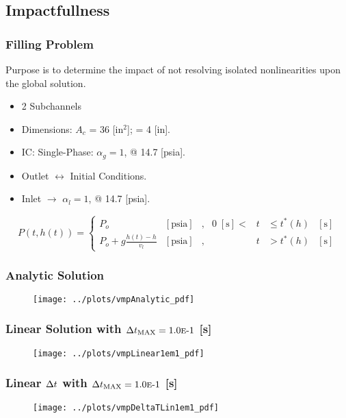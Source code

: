 \documentclass[compress,xcolor=table]{beamer}
\begin{document}
\subsection[Impactfullness]{Impactfullness}
\begin{frame}
\frametitle{Filling Problem}

Purpose is to determine the impact of not resolving isolated nonlinearities upon the global solution.

\begin{itemize}
\item{2 Subchannels}
\item{Dimensions: $A_{c}$ = 36 [in$^2$]; \dx{} = 4 [in].}
\item{IC: Single-Phase: $\alpha_{g} = 1$, @ 14.7 [psia].}
\item{Outlet $\longleftrightarrow$ Initial Conditions.}
\item{Inlet $\rightarrow$ $\alpha_{l}=1$, @ 14.7 [psia].}
\end{itemize}
\begin{equation*}
P(t, h(t))= 
 \left\{
\begin{array}{cclrcll}
P_o & [ \text{psia} ] & , & 0\; [\text{s}] < & t & \leq t^{*}(h) & [\text{s}] \\
P_o + g \frac{ h(t) - h }{ v_{l} } & [ \text{psia} ] & , &  & t & > t^{*}(h) & [\text{s}]
\end{array}\right.
\end{equation*}

\end{frame}
\begin{frame}
\frametitle{Analytic Solution}

\begin{figure}[h!t]
\centering
\texttt{[image: ../plots/vmpAnalytic\_pdf]}
\end{figure}

\end{frame}
\begin{frame}
\frametitle{Linear Solution with $\dtmax{} = \expneg{1.0}{1}$ [s]}

\begin{figure}[h!t]
\centering
\texttt{[image: ../plots/vmpLinear1em1\_pdf]}
\end{figure}

\end{frame}
\begin{frame}
\frametitle{Linear $\dt{}$ with $\dtmax{} = \expneg{1.0}{1}$ [s]}

\begin{figure}[h!t]
\centering
\texttt{[image: ../plots/vmpDeltaTLin1em1\_pdf]}
\end{figure}

\end{frame}
\end{document}
